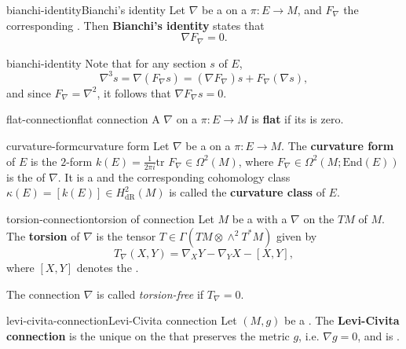 \begin{topic}{bianchi-identity}{Bianchi's identity}
    Let $\nabla$ be a  on a  $\pi : E \to M$, and $F_\nabla$ the corresponding . Then \textbf{Bianchi's identity} states that
    \[ \nabla F_\nabla = 0 . \]
\end{topic}

\begin{example}{bianchi-identity}
    Note that for any section $s$ of $E$,
    \[ \nabla^3 s = \nabla (F_\nabla s) = (\nabla F_\nabla) s + F_\nabla (\nabla s) , \]
    and since $F_\nabla = \nabla^2$, it follows that $\nabla F_\nabla s = 0$.
\end{example}

\begin{topic}{flat-connection}{flat connection}
    A  $\nabla$ on a  $\pi : E \to M$ is \textbf{flat} if its  is zero.
\end{topic}

\begin{topic}{curvature-form}{curvature form}
    Let $\nabla$ be a  on a  $\pi : E \to M$. The \textbf{curvature form} of $E$ is the $2$-form $k(E) = \frac{1}{2 \pi i} \text{tr } F_\nabla \in \Omega^2(M)$, where $F_\nabla \in \Omega^2(M; \text{End}(E))$ is the  of $\nabla$. It is a  and the corresponding cohomology class $\kappa(E) = [k(E)] \in H_\text{dR}^2(M)$ is called the \textbf{curvature class} of $E$.
\end{topic}

\begin{topic}{torsion-connection}{torsion of connection}
    Let $M$ be a  with a  $\nabla$ on the  $TM$ of $M$. The \textbf{torsion} of $\nabla$ is the tensor $T \in \Gamma(TM \otimes \wedge^2 T^* M)$ given by
    \[ T_\nabla(X, Y) = \nabla_X Y  - \nabla_Y X - [X, Y] , \]
    where $[X, Y]$ denotes the .
    
    The connection $\nabla$ is called \textit{torsion-free} if $T_\nabla = 0$.
\end{topic}

\begin{topic}{levi-civita-connection}{Levi-Civita connection}
    Let $(M, g)$ be a . The \textbf{Levi-Civita connection} is the unique  on the  that preserves the metric $g$, i.e. $\nabla g = 0$, and is .
\end{topic}

